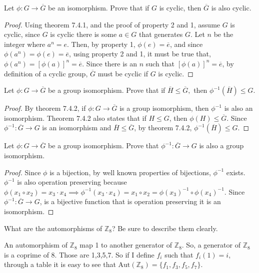 \documentclass[titlepage]{article}
\newenvironment{problem}[2][Problem]{\begin{tcolorbox}\begin{trivlist}
\item[\hskip \labelsep {\bfseries #1}\hskip \labelsep {\bfseries #2.}]}{\end{trivlist}\end{tcolorbox}}
\begin{document}
\begin{problem}{11}
Let $\phi:G \rightarrow \overline{G}$ be an isomorphism. Prove that if $G$ is cyclic, then $\overline{G}$ is also cyclic.
\end{problem}
\begin{proof}
Using theorem 7.4.1, and the proof of property 2 and 1, assume $G$ is cyclic, since $G$ is cyclic there is some $a \in G$ that generates $G$. Let $n$ be the integer where $a^n = e$. Then, by property 1, $\phi(e) = \overline{e}$, and since $\phi(a^n) = \phi(e) = \overline{e}$, using property 2 and 1, it must be true that, $\phi(a^n) = [\phi(a)]^n = \overline{e}$. Since there is an $n$ such that $[\phi(a)]^n = \overline{e}$, by definition of a cyclic group, $\overline{G}$ must be cyclic if $G$ is cyclic.
\end{proof}


\begin{problem}{12}
Let $\phi:G \rightarrow \overline{G}$ be a group isomorphism. Prove that if $\overline{H} \leq \overline{G},$ then $\phi^{-1}(\overline{H}) \leq G$.
\end{problem}
\begin{proof}
By theorem 7.4.2, if $\phi: G \rightarrow \overline{G}$ is a group isomorphism, then $\phi^{-1}$ is also an isomorphism. Theorem 7.4.2 also states that if $H \leq G$, then $\phi(H) \leq \overline{G}$. Since $\phi^{-1}: \overline{G} \rightarrow G$ is an isomorphism and $\overline{H} \leq \overline{G}$, by theorem 7.4.2, $\phi^{-1}(\overline{H}) \leq G$.
\end{proof}


\begin{problem}{13}
Let $\phi:G\rightarrow\overline{G}$ be a group isomorphism. Prove that $\phi^{-1}: \overline{G} \rightarrow G$ is also a group isomorphism.  
\end{problem}
\begin{proof}
Since $\phi$ is a bijection, by well known properties of bijections, $\phi^{-1}$ exists. $\phi^{-1}$ is also operation preserving because $\phi(x_1 \circ x_2) = x_3 \cdot x_4 \implies \phi^{-1}(x_3 \cdot x_4) = x_1 \circ x_2 = \phi(x_3)^{-1}\circ \phi(x_4)^{-1}$. Since $\phi^{-1}: \overline{G} \rightarrow G$, is a bijective function that is operation preserving it is an isomorphism. 
\end{proof}


\begin{problem}{14}
What are the automorphisms of $\mathbb{Z}_8$? Be sure to describe them clearly.
\end{problem}
An automorphism of $\mathbb{Z}_{8}$ map 1 to another generator of $\mathbb{Z}_8$. So, a generator of $\mathbb{Z}_8$ is a coprime of 8. Those are 1,3,5,7. So if I define $f_i$ such that $f_i(1) = i$, through a table it is easy to see that $\text{Aut}(\mathbb{Z}_8) = \{f_1,f_3,f_5,f_7\}$.
\end{document}

